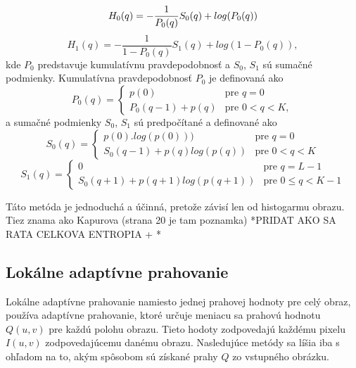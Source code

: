 \documentclass[a4paper,11pt,twoside]{article}%
\begin{document}
\begin{equation*}
H_0(q) =  -\frac{1}{P_0(q)}S_0(q)+log(P_0(q)) \\
\end{equation*}
\begin{equation*}
H_1(q) =  -\frac{1}{1-P_0(q)}S_1(q)+log(1-P_0(q)),
\end{equation*}
kde $P_0$ predstavuje kumulatívnu pravdepodobnosť a $S_0$, $S_1$ sú sumačné podmienky. 
Kumulatívna pravdepodobnosť $P_0$ je definovaná ako
\begin{equation*}
	P_0(q) = \begin{cases} p(0) & \text{pre } q = 0 \\
                            P_0(q-1) + p(q)         & \text{pre } 0 < q < K ,     %
        \end{cases}
 \end{equation*} 
a sumačné podmienky $S_0$, $S_1$ sú predpočítané a definované ako
 \begin{equation*}   
    S_0(q) = \begin{cases} p(0).log(p(0))) & \text{pre } q = 0 \\
                            S_0(q-1) + p(q)log(p(q))         & \text{pre } 0 < q < K      
        \end{cases}
        \end{equation*}
\begin{equation*}
	S_1(q) = \begin{cases} 0 & \text{pre } q = L-1 \\
                            S_0(q+1) + p(q+1)log(p(q+1))         & \text{pre } 0 \leq q < K -1      %
        \end{cases}       	 
\end{equation*}

Táto metóda je jednoduchá a účinná, pretože závisí len od histogarmu obrazu. %
Tiez znama ako Kapurova (strana 20 je tam poznamka)
*PRIDAT AKO SA RATA CELKOVA ENTROPIA + *

\subsection{Lokálne adaptívne prahovanie}

Lokálne adaptívne prahovanie namiesto jednej prahovej hodnoty pre celý obraz, používa adaptívne prahovanie, ktoré určuje meniacu sa prahovú hodnotu $Q(u,v)$ pre každú polohu obrazu. Tieto hodoty zodpovedajú každému pixelu $I(u,v)$ zodpovedajúcemu danému obrazu. Nasledujúce metódy sa líšia iba s ohľadom na to, akým spôsobom sú získané prahy $Q$ zo vstupného obrázku. 
\end{document}

